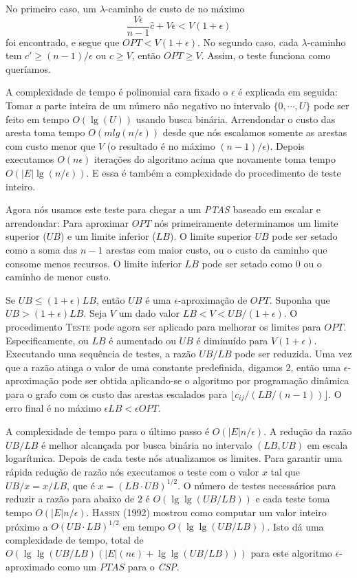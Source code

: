 \documentclass[10pt,a4paper]{article}
\begin{document}
No primeiro caso, um $\lambda$-caminho de custo de no máximo
$$ \frac{V\epsilon}{n - 1} \hat{c} + V\epsilon < V(1+\epsilon)$$
foi encontrado, e segue que $OPT < V(1+\epsilon)$. No segundo caso, cada 
$\lambda$-caminho tem $c' \ge (n-1)/\epsilon$ ou $c \ge V$, então $OPT 
\ge V$. Assim, o teste funciona como queríamos.

A complexidade de tempo é polinomial cara fixado o $\epsilon$ é 
explicada em seguida: Tomar a parte inteira de um número não negativo no 
intervalo $\{0, \cdots, U\}$ pode ser feito em tempo $O(\lg(U))$ usando 
busca binária. Arrendondar o custo das aresta toma tempo 
$O(mlg(n/\epsilon))$ desde que nós escalamos somente as arestas com 
custo menor que $V$ (o resultado é no máximo $(n-1)/\epsilon)$. Depois 
executamos $O(n\epsilon)$ iterações do algoritmo acima que novamente 
toma tempo $O(|E|\lg(n/\epsilon))$. E essa é também a complexidade do 
procedimento de teste inteiro.

Agora nós usamos este teste para chegar a um \emph{PTAS} baseado em 
escalar e arrendondar: Para aproximar $OPT$ nós primeiramente 
determinamos um limite superior ($UB$) e um limite inferior ($LB$).  O 
limite superior $UB$ pode ser setado como a soma das $n-1$ arestas com 
maior custo, ou o custo da caminho que consome menos recursos. O limite 
inferior $LB$ pode ser setado como $0$ ou o caminho de menor custo.

Se $UB \le (1 + \epsilon)LB$, então $UB$ é uma $\epsilon$-aproximação de 
$OPT$. Suponha que $UB > (1+\epsilon)LB$. Seja $V$ um dado valor $LB < V 
< UB/(1+\epsilon)$. O procedimento \textsc{Teste} pode agora ser 
aplicado para melhorar os limites para $OPT$. Especificamente, ou $LB$ é 
aumentado ou $UB$ é diminuído para $V(1+\epsilon)$. Executando uma 
sequência de testes, a razão $UB/LB$ pode ser reduzida. Uma vez que a 
razão atinga o valor de uma constante predefinida, digamos $2$, então 
uma $\epsilon$-aproximação pode ser obtida aplicando-se o algoritmo por 
programação dinâmica para o grafo com os custo das arestas escalados 
para $\lfloor c_{ij} / (LB/(n-1)) \rfloor$. O erro final é no máximo 
$\epsilon LB < \epsilon OPT$.

A complexidade de tempo para o último passo é $O(|E|n/\epsilon)$. A 
redução da razão $UB/LB$ é melhor alcançada por busca binária no 
intervalo $(LB, UB)$ em escala logarítmica. Depois de cada teste nós 
atualizamos os limites. Para garantir uma rápida redução de razão nós 
executamos o teste com o valor $x$ tal que $UB/x=x/LB$, que é $x = 
(LB\cdot UB)^{1/2}$. O número de testes necessários para reduzir a razão 
para abaixo de $2$ é $O(\lg\lg(UB/LB))$ e cada teste toma tempo 
$O(|E|n/\epsilon)$. \textsc{Hassin (1992)} mostrou como computar um 
valor inteiro próximo a $O(UB\cdot LB)^{1/2}$ em tempo 
$O(\lg\lg(UB/LB))$. Isto dá uma complexidade de tempo, total de 
$O(\lg\lg(UB/LB)(|E|(n\epsilon) + \lg\lg(UB/LB)))$ para este algoritmo 
$\epsilon$-aproximado como um $PTAS$ para o \emph{CSP}.
\end{document}
